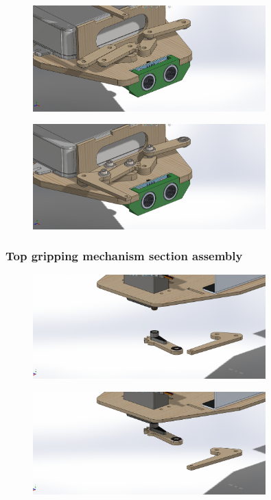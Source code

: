 \documentclass{article}
\begin{document}
\begin{figure}[H]
    \centering
    \includegraphics[width=0.8\textwidth]{assets/assembly/3.png}
\end{figure}

\begin{figure}[H]
    \centering
    \includegraphics[width=0.8\textwidth]{assets/assembly/4.png}
\end{figure}

\subsubsection{Top gripping mechanism section assembly} 

\begin{figure}[H]
    \centering
    \includegraphics[width=0.8\textwidth]{assets/assembly/5.png}
\end{figure}

\begin{figure}[H]
    \centering
    \includegraphics[width=0.8\textwidth]{assets/assembly/6.png}
\end{figure}
\end{document}

